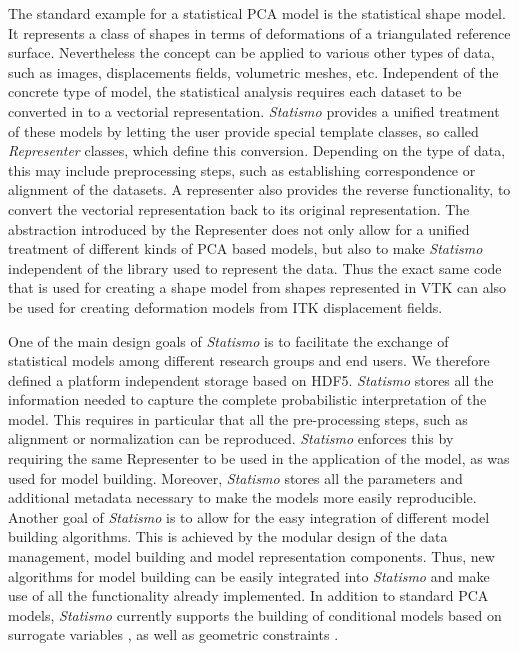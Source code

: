 \documentclass{InsightArticle}
\newcommand{\Statismo}{\emph{Statismo}\xspace}
\begin{document}
The standard example for a statistical PCA model is the statistical
shape model.  It represents a class of shapes in terms of deformations
of a triangulated reference surface. Nevertheless the concept can be
applied to various other types of data, such as images, displacements
fields, volumetric meshes, etc. Independent of the concrete type of
model, the statistical analysis requires each dataset to be converted
in to a vectorial representation.  \Statismo provides a unified
treatment of these models by letting the user provide special template
classes, so called \emph{Representer} classes, which define this
conversion.  Depending on the type of data, this may include
preprocessing steps, such as establishing correspondence or alignment of
the datasets.  A representer also provides the reverse
functionality, to convert the vectorial representation back to its
original representation.  The abstraction introduced by the
Representer does not only allow for a unified treatment of different
kinds of PCA based models, but also to make \Statismo independent of
the library used to represent the data. Thus the exact same code that
is used for creating a shape model from shapes represented in VTK can
also be used for creating deformation models from ITK displacement
fields.

One of the main design goals of \Statismo is to facilitate the exchange of
statistical models among different research groups and end users. We therefore
defined a platform independent storage based on HDF5. \Statismo stores all the 
information needed to capture the complete probabilistic interpretation of the model.
This requires in particular that all the pre-processing steps, such as alignment or normalization 
can be reproduced. \Statismo enforces this by requiring the same Representer to be used 
in the application of the model, as was used for model building. Moreover, \Statismo stores
all the parameters and additional metadata necessary to make the models more easily reproducible. 
Another goal of \Statismo is to allow for the easy integration of
different model building algorithms. This is achieved by the modular design of the data management, model building and model representation components. Thus, new algorithms for model building can be easily
integrated into \Statismo and make use of all the functionality
already implemented.  In addition to  standard PCA models, \Statismo
currently supports the building of conditional models based on surrogate
variables \cite{blanc_conditional_2009}, as well as geometric constraints \cite{luthi_probabilistic_2009}.
\end{document}
